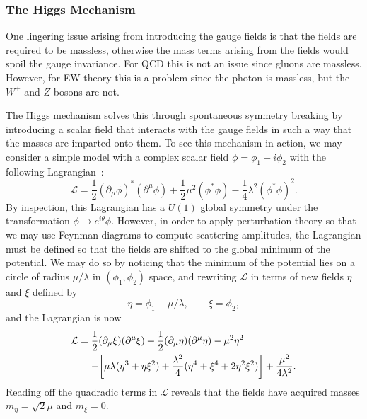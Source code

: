 \subsubsection{The Higgs Mechanism}
One lingering issue arising from introducing the gauge fields is that the fields are required to be massless, otherwise the mass terms arising from the fields would spoil the gauge invariance.
For QCD this is not an issue since gluons are massless.
However, for EW theory this is a problem since the photon is massless, but the $W^\pm$ and $Z$ bosons are not.

The Higgs mechanism solves this through spontaneous symmetry breaking by introducing a scalar field that interacts with the gauge fields in such a way that the masses are imparted onto them.
To see this mechanism in action, we may consider a simple model with a complex scalar field $\phi=\phi_1+i\phi_2$ with the following Lagrangian~\cite{GriffithsParticle}:
\begin{equation}
  \mathcal{L}=\frac{1}{2}(\partial_\mu\phi)^*(\partial^\mu\phi)+\frac{1}{2}\mu^2(\phi^*\phi)-\frac{1}{4}\lambda^2(\phi^*\phi)^2.
\end{equation}
By inspection, this Lagrangian has a $U(1)$ global symmetry under the transformation $\phi\to e^{i\theta}\phi$.
However, in order to apply perturbation theory so that we may use Feynman diagrams to compute scattering amplitudes, the Lagrangian must be defined so that the fields are shifted to the global minimum of the potential\footnotemark.
We may do so by noticing that the minimum of the potential lies on a circle of radius $\mu/\lambda$ in $(\phi_1,\phi_2)$ space, and rewriting $\mathcal{L}$ in terms of new fields $\eta$ and $\xi$ defined by
\begin{equation}\label{eq:fields}
  \eta=\phi_1-\mu/\lambda,\qquad \xi=\phi_2,
\end{equation}
and the Lagrangian is now
\begin{equation}
  \begin{aligned}
    \mathcal{L} &= \frac{1}{2}(\partial_\mu\xi)(\partial^\mu\xi)+\frac{1}{2}(\partial_\mu\eta)(\partial^\mu\eta)-\mu^2\eta^2\\
    &\equad- \bqty{\mu\lambda(\eta^3+\eta\xi^2)+\frac{\lambda^2}{4}(\eta^4+\xi^4+2\eta^2\xi^2)}+\frac{\mu^2}{4\lambda^2}.
  \end{aligned}
\end{equation}
Reading off the quadradic terms in $\mathcal{L}$ reveals that the fields have acquired masses $m_\eta=\sqrt{2}\mu$ and $m_\xi=0$.

